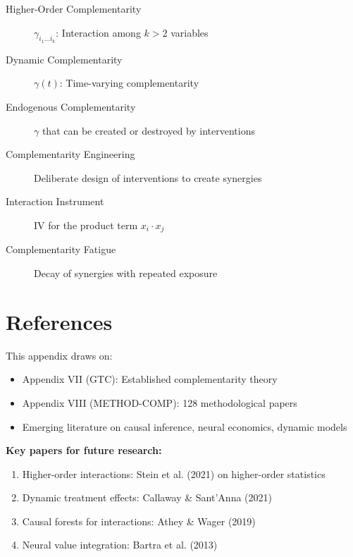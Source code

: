 \begin{description}
    \item[Higher-Order Complementarity] $\gamma_{i_1 \ldots i_k}$: Interaction among $k > 2$ variables
    \item[Dynamic Complementarity] $\gamma(t)$: Time-varying complementarity
    \item[Endogenous Complementarity] $\gamma$ that can be created or destroyed by interventions
    \item[Complementarity Engineering] Deliberate design of interventions to create synergies
    \item[Interaction Instrument] IV for the product term $x_i \cdot x_j$
    \item[Complementarity Fatigue] Decay of synergies with repeated exposure
\end{description}

\section{References}
\label{sec:references}

\nocite{bcm_master}

This appendix draws on:
\begin{itemize}[noitemsep]
    \item Appendix VII (GTC): Established complementarity theory
    \item Appendix VIII (METHOD-COMP): 128 methodological papers
    \item Emerging literature on causal inference, neural economics, dynamic models
\end{itemize}

\textbf{Key papers for future research:}
\begin{enumerate}
    \item Higher-order interactions: Stein et al. (2021) on higher-order statistics
    \item Dynamic treatment effects: Callaway \& Sant'Anna (2021)
    \item Causal forests for interactions: Athey \& Wager (2019)
    \item Neural value integration: Bartra et al. (2013)
\end{enumerate}

